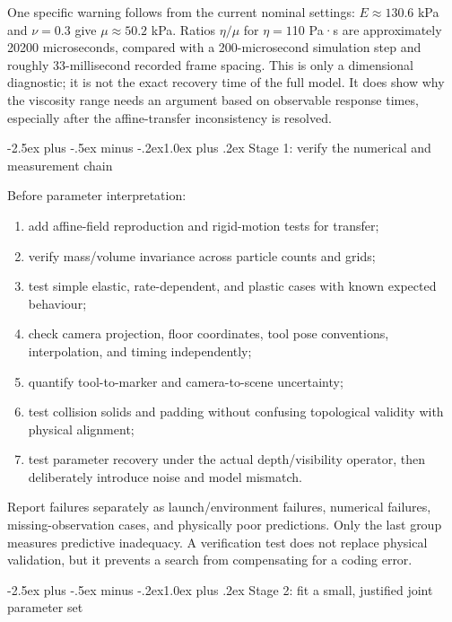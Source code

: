 \documentclass[
  11pt,
]{article}
\makeatletter
\providecommand{\tightlist}{%
  \setlength{\itemsep}{0pt}\setlength{\parskip}{0pt}}
\renewcommand\subsection{\needspace{5\baselineskip}\@startsection{subsection}{2}{\z@}%
  {-2.5ex plus -.5ex minus -.2ex}{1.0ex plus .2ex}%
  {\normalfont\sffamily\large\bfseries\color{accent}}}
\makeatother
\begin{document}
One specific warning follows from the current nominal settings:
\(E\approx130.6\) kPa and \(\nu=0.3\) give \(\mu\approx50.2\) kPa.
Ratios \(\eta/\mu\) for \(\eta=1\)\textendash{}\allowbreak{}10 Pa·s are
approximately 20\textendash{}\allowbreak{}200 microseconds, compared
with a 200-microsecond simulation step and roughly 33-millisecond
recorded frame spacing. This is only a dimensional diagnostic; it is not
the exact recovery time of the full model. It does show why the
viscosity range needs an argument based on observable response times,
especially after the affine-transfer inconsistency is resolved.

\subsection{Stage 1: verify the numerical and measurement
chain}\label{stage-1-verify-the-numerical-and-measurement-chain}

Before parameter interpretation:

\begin{enumerate}
\def\labelenumi{\arabic{enumi}.}
\tightlist
\item
  add affine-field reproduction and rigid-motion tests for transfer;
\item
  verify mass/volume invariance across particle counts and grids;
\item
  test simple elastic, rate-dependent, and plastic cases with known
  expected behaviour;
\item
  check camera projection, floor coordinates, tool pose conventions,
  interpolation, and timing independently;
\item
  quantify tool-to-marker and camera-to-scene uncertainty;
\item
  test collision solids and padding without confusing topological
  validity with physical alignment;
\item
  test parameter recovery under the actual depth/visibility operator,
  then deliberately introduce noise and model mismatch.
\end{enumerate}

Report failures separately as launch/environment failures, numerical
failures, missing-observation cases, and physically poor predictions.
Only the last group measures predictive inadequacy. A verification test
does not replace physical validation, but it prevents a search from
compensating for a coding error.

\subsection{Stage 2: fit a small, justified joint parameter
set}\label{stage-2-fit-a-small-justified-joint-parameter-set}
\end{document}
